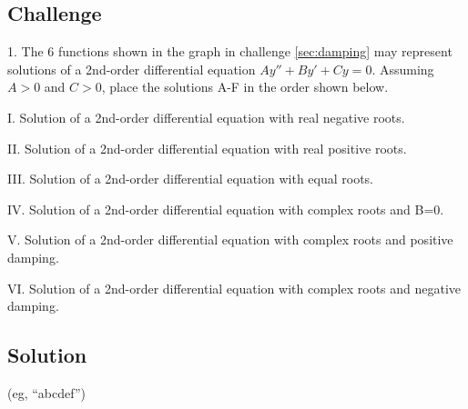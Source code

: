 \subsection*{Challenge}
1. The 6 functions shown in the graph in challenge \ref{sec:damping} may represent solutions of a 2nd-order differential equation $Ay'' + By' + Cy = 0$. Assuming $A>0$ and $C>0$, place the solutions A-F in the order shown below.%

I. Solution of a 2nd-order differential equation with real negative roots.

II. Solution of a 2nd-order differential equation with real positive roots.

III. Solution of a 2nd-order differential equation with equal roots.

IV. Solution of a 2nd-order differential equation with complex roots and B=0.

V. Solution of a 2nd-order differential equation with complex roots and positive damping.

VI. Solution of a 2nd-order differential equation with complex roots and negative damping.

\subsection*{Solution}
(eg, ``abcdef'')





